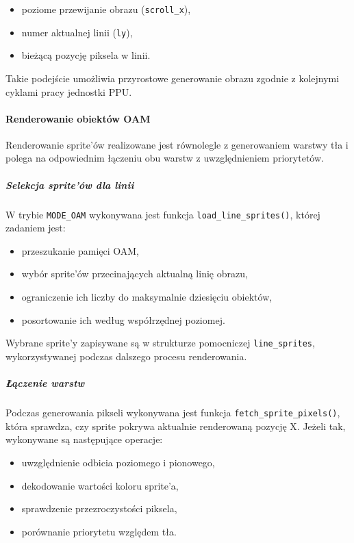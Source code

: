 \documentclass{article}
\begin{document}
\begin{itemize}
	\item poziome przewijanie obrazu (\texttt{scroll\_x}),
	\item numer aktualnej linii (\texttt{ly}),
	\item bieżącą pozycję piksela w linii.
\end{itemize}

Takie podejście umożliwia przyrostowe generowanie obrazu zgodnie z kolejnymi cyklami pracy jednostki PPU.

\paragraph{Renderowanie obiektów OAM}

Renderowanie sprite'ów realizowane jest równolegle z generowaniem warstwy tła i polega na odpowiednim łączeniu obu warstw z uwzględnieniem priorytetów.

\subparagraph{Selekcja sprite'ów dla linii}

W trybie \texttt{MODE\_OAM} wykonywana jest funkcja \texttt{load\_line\_sprites()}, której zadaniem jest:

\begin{itemize}
	\item przeszukanie pamięci OAM,
	\item wybór sprite'ów przecinających aktualną linię obrazu,
	\item ograniczenie ich liczby do maksymalnie dziesięciu obiektów,
	\item posortowanie ich według współrzędnej poziomej.
\end{itemize}

Wybrane sprite'y zapisywane są w strukturze pomocniczej \texttt{line\_sprites}, wykorzystywanej podczas dalszego procesu renderowania.

\subparagraph{Łączenie warstw}

Podczas generowania pikseli wykonywana jest funkcja \texttt{fetch\_sprite\_pixels()}, która sprawdza, czy sprite pokrywa aktualnie renderowaną pozycję X. Jeżeli tak, wykonywane są następujące operacje:

\begin{itemize}
	\item uwzględnienie odbicia poziomego i pionowego,
	\item dekodowanie wartości koloru sprite'a,
	\item sprawdzenie przezroczystości piksela,
	\item porównanie priorytetu względem tła.
\end{itemize}
\end{document}
